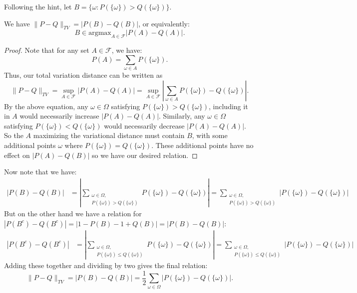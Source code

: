 \documentclass{pset}
\begin{document}
\begin{solution}
    Following the hint, let $B = \{\omega : P(\{\omega\}) > Q(\{\omega\})\}$. 
    \begin{claim} We have $\|P-Q\|_{TV} = |P(B)-Q(B)|$, or equivalently:
        \[
            B \in \textrm{argmax}_{A \in \mathcal{F}}|P(A)-Q(A)|
        .\] 
    \end{claim}
    \begin{proof}
        Note that for any set $A\in \mathcal{F}$, we have:
        \[
            P(A) = \sum_{\omega\in A} P(\{\omega\})
        .\] 
        Thus, our total variation distance can be written as 
        \[
            \|P-Q\|_{TV} = \sup_{A\in \mathcal{F}}|P(A) - Q(A)| = \sup_{A\in \mathcal{F}}\left|\sum_{\omega\in A} P(\{\omega\}) - Q(\{\omega\})\right|
        .\] 
        By the above equation, any $\omega\in \Omega$ satisfying $P(\{\omega\}) > Q(\{\omega\})$, including it in $A$ would necessarily increase $|P(A)-Q(A)|$. Similarly, any $\omega\in \Omega$ satisfying $P(\{\omega\})<Q(\{\omega\})$ would necessarily decrease $|P(A) - Q(A)|$. So the $A$ maximizing the variational distance must contain $B$, with some additional points $\omega$ where $P(\{\omega\}) = Q(\{\omega\})$. These additional points have no effect on $|P(A)-Q(B)|$ so we have our desired relation.
    \end{proof}
    Now note that we have:
    \[
        \begin{aligned}
            |P(B)-Q(B)| &= \left|\sum_{\substack{\omega\in \Omega,\\P(\{\omega\}) > Q(\{\omega\})}} P(\{\omega\}) - Q(\{\omega\})\right|=\sum_{\substack{\omega\in \Omega,\\P(\{\omega\}) > Q(\{\omega\})}} |P(\{\omega\})-Q(\{\omega\})|
        \end{aligned}
    \] 
    But on the other hand we have a relation for $|P(B^c) - Q(B^c)|=|1-P(B)-1+Q(B)|=|P(B)-Q(B)|$:
    \[
        \begin{aligned}
            |P(B^c) - Q(B^c)| &= \left|\sum_{\substack{\omega\in \Omega,\\P(\{\omega\}) \leq Q(\{\omega\})}} P(\{\omega\}) - Q(\{\omega\})\right|=\sum_{\substack{\omega\in \Omega,\\P(\{\omega\}) \leq Q(\{\omega\})}} |P(\{\omega\})-Q(\{\omega\})|
        \end{aligned}
    \] 
    Adding these together and dividing by two gives the final relation:
    \[
        \|P-Q\|_{TV} = |P(B)-Q(B)| = \frac{1}{2}\sum_{\omega\in \Omega}|P(\{\omega\}) - Q(\{\omega\})|
    .\] 
\end{solution}
\end{document}

